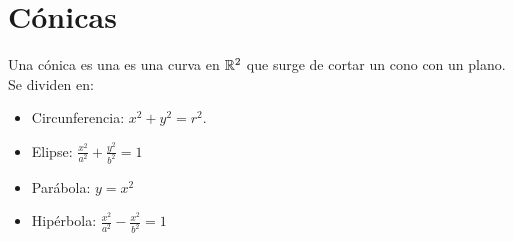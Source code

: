 \documentclass{article}
\begin{document}
\section{Cónicas}
Una cónica es una es una curva en $\mathbb{R}^2$ que surge de cortar un cono con un plano.
Se dividen en:
\begin{itemize}
	\item Circunferencia: $x^2 + y^2 = r^2$.
	\item Elipse: $\frac{x^2}{a^2} + \frac{y^2}{b^2} = 1$
	\item Parábola: $y = x^2$
	\item Hipérbola: $\frac{x^2}{a^2} - \frac{x^2}{b^2} = 1$
\end{itemize}
\end{document}
